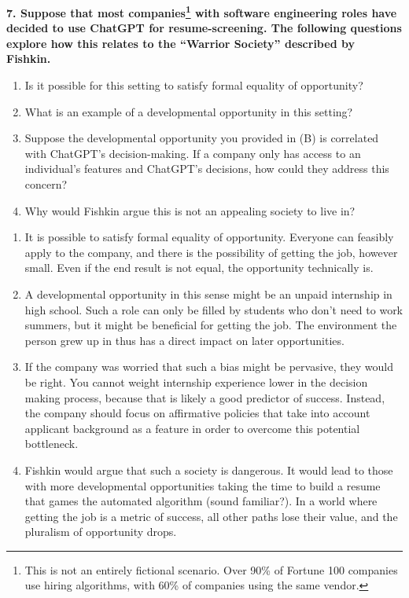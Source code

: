 \documentclass{article}
\begin{document}
\textbf{7. Suppose that most companies\footnote{This is not an entirely fictional scenario. Over 90\% of Fortune 100 companies use hiring algorithms, with 60\% of companies using the same vendor.} with software engineering roles have decided to use ChatGPT for resume-screening. The following questions explore how this relates to the ``Warrior Society'' described by Fishkin.}
\begin{enumerate}[label=\Alph*.]
    \item Is it possible for this setting to satisfy formal equality of opportunity? 
    \item What is an example of a developmental opportunity in this setting? 
    \item Suppose the developmental opportunity you provided in (B) is correlated with ChatGPT's decision-making. If a company only has access to an individual's features and ChatGPT's decisions, how could they address this concern? 
    \item Why would Fishkin argue this is not an appealing society to live in?
\end{enumerate}
\bigskip
\begin{mdframed}
\begin{enumerate}[label=\Alph*.]
\item It is possible to satisfy formal equality of opportunity. Everyone can feasibly apply to the company, and there is the possibility of getting the job, however small. Even if the end result is not equal, the opportunity technically is.
\item A developmental opportunity in this sense might be an unpaid internship in high school. Such a role can only be filled by students who don't need to work summers, but it might be beneficial for getting the job. The environment the person grew up in thus has a direct impact on later opportunities.
\item If the company was worried that such a bias might be pervasive, they would be right. You cannot weight internship experience lower in the decision making process, because that is likely a good predictor of success. Instead, the company should focus on affirmative policies that take into account applicant background as a feature in order to overcome this potential bottleneck. 
\item Fishkin would argue that such a society is dangerous. It would lead to those with more developmental opportunities taking the time to build a resume that games the automated algorithm (sound familiar?). In a world where getting the job is a metric of success, all other paths lose their value, and the pluralism of opportunity drops.
\end{enumerate}
\end{mdframed}
\bigskip
\end{document}
